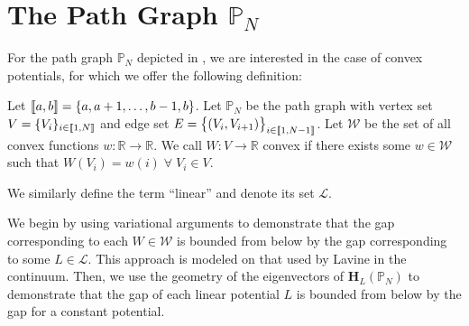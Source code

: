 \section{The Path Graph $\mathbb{P}_{N}$}\label{sec:path}

  For the path graph $\mathbb{P}_N$ depicted in , we are interested in the case of convex potentials, for which we offer the following definition:
    \begin{definition}\label{def:convex}
      Let $\left \llbracket a , b \right \rrbracket = \{a,a+1,\dots,b-1,b\}$. Let $\mathbb{P}_N$ be the path graph with vertex set $V=\{V_i\}_{i\in \left \llbracket 1 , N \right \rrbracket}$ and edge set $E=\big\{(V_i,V_{i+1})\big\}_{i\in\left \llbracket 1 , N-1 \right \rrbracket}$. Let $\mathcal{W}$ be the set of all convex functions $w:\mathbb{R}\rightarrow\mathbb{R}$. We call $W:V\rightarrow \mathbb{R}$ convex if there exists some $w \in \mathcal{W}$ such that $W(V_i) = w(i) \; \forall \; V_i \in V$.

      We similarly define the term ``linear'' and denote its set $\mathcal{L}$.
    \end{definition}

  We begin by using variational arguments to demonstrate that the gap corresponding to each $W\in\mathcal{W}$ is bounded from below by the gap corresponding to some $L\in\mathcal{L}$. This approach is modeled on that used by Lavine in the continuum.\cite{Lavine1994} Then, we use the geometry of the eigenvectors of $\mathbf{H}_L(\mathbb{P}_N)$ to demonstrate that the gap of each linear potential $L$ is bounded from below by the gap for a constant potential.

